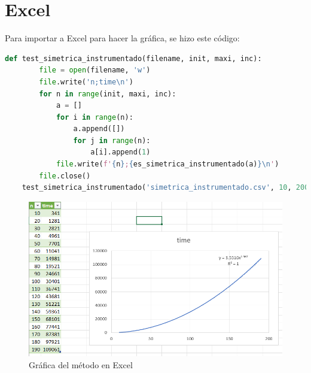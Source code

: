 \documentclass[stu, 12pt, letterpaper, donotrepeattitle, floatsintext, natbib, helv]{apa7}
\begin{document}
\section{Excel}
Para importar a Excel para hacer la gráfica, se hizo este código:
{\scriptsize
\begin{lstlisting}[language=Python]
    def test_simetrica_instrumentado(filename, init, maxi, inc):
        file = open(filename, 'w')
        file.write('n;time\n')
        for n in range(init, maxi, inc):
            a = []
            for i in range(n):
                a.append([])
                for j in range(n):
                    a[i].append(1)
            file.write(f'{n};{es_simetrica_instrumentado(a)}\n')
        file.close()
    test_simetrica_instrumentado('simetrica_instrumentado.csv', 10, 200, 10)
\end{lstlisting}}

\begin{figure}[h]
    \centering
    \includegraphics[width=1\textwidth]{Screenshot 2022-03-24 044713.png}
    \caption{Gráfica del método en Excel}
    \label{fig:figureExcel1}
\end{figure}
\nocite{Clase21Mar}
\newpage
\renewcommand\refname{\large\textbf{Referencias}}

\end{document}
